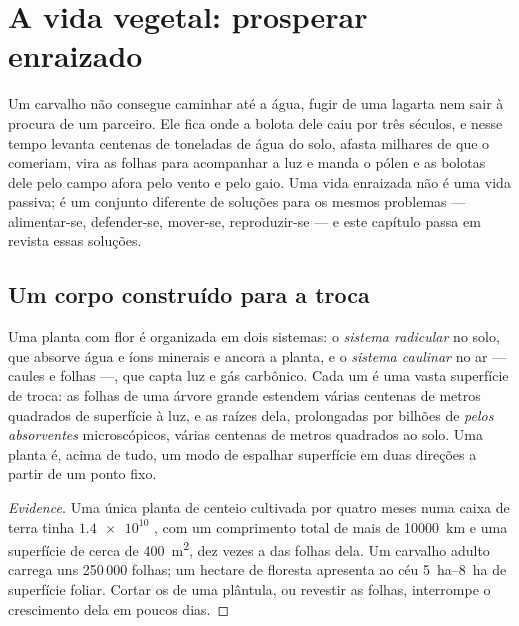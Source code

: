 \chapter{A vida vegetal: prosperar enraizado}\label{ch:g12:plant-rooted-life}

Um carvalho não consegue caminhar até a água, fugir de uma lagarta nem
sair à procura de um parceiro. Ele fica onde a bolota dele caiu por três
séculos, e nesse tempo levanta centenas de toneladas de água do solo,
afasta milhares de  que o comeriam, vira as folhas para
acompanhar a luz e manda o pólen e as bolotas dele pelo campo afora
pelo vento e pelo gaio. Uma vida enraizada não é uma vida passiva; é um
conjunto diferente de soluções para os mesmos problemas --- alimentar-se,
defender-se, mover-se, reproduzir-se --- e este capítulo passa em revista essas soluções.

\section{Um corpo construído para a troca}

\begin{proposition}\label{prop:g12:plant-rooted-life:surfaces}
Uma planta com flor é organizada em dois sistemas: o \emph{sistema
radicular} no solo, que absorve água e íons minerais e ancora a planta,
e o \emph{sistema caulinar} no ar --- caules e folhas ---, que capta luz
e gás carbônico. Cada um é uma vasta superfície de troca: as folhas de
uma árvore grande estendem várias centenas de metros quadrados de
superfície à luz, e as raízes dela, prolongadas por bilhões de
\emph{pelos absorventes} microscópicos, várias
centenas de metros quadrados ao solo. Uma planta é, acima de tudo, um
modo de espalhar superfície em duas direções a partir de um ponto fixo.
\end{proposition}
\begin{proof}[Evidence]
Uma única planta de centeio cultivada por quatro meses numa caixa de
terra tinha $\num{1.4e10}$ , com um comprimento total
de mais de \qty{10000}{km} e uma superfície de cerca de
\qty{400}{m^2}, dez vezes a das folhas dela. Um carvalho adulto carrega
uns 250\,000 folhas; um hectare de floresta apresenta ao céu
\qtyrange{5}{8}{ha} de superfície foliar. Cortar os 
de uma plântula, ou revestir as folhas, interrompe o crescimento dela em poucos dias.
\end{proof}


